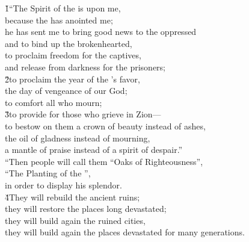 
\begin{poetry}
\poeml {}
\v{1}``The Spirit of the  is upon me, \\
\poemll    because the  has anointed me; \\
\poeml he has sent me to bring good news to the oppressed \\
\poemll    and to bind up the brokenhearted, \\
\poeml to proclaim freedom for the captives, \\
\poemll    and release from darkness for the prisoners; \\
\poeml \v{2}to proclaim the year of the 's favor, \\
\poemll    the day of vengeance of our God; \\
\poemlll       to comfort all who mourn; \\
\poeml \v{3}to provide for those who grieve in Zion--- \\
\poemll    to bestow on them a crown of beauty instead of ashes, \\
\poeml the oil of gladness instead of mourning, \\
\poemll    a mantle of praise instead of a spirit of despair.'' \\
\poeml ``Then people will call them ``Oaks of Righteousness'', \\
\poemll    ``The Planting of the '', \\
\poemlll       in order to display his splendor. \\
\poeml \v{4}They will rebuild the ancient ruins; \\
\poemll    they will restore the places long devastated; \\
\poeml they will build again the ruined cities, \\
\poemll    they will build again the places devastated for many generations. \\

\end{poetry}
